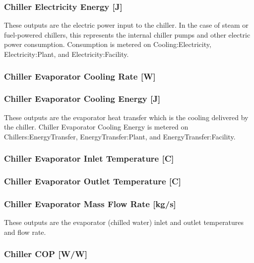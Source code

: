 \subsubsection{Chiller Electricity Energy {[}J{]}}\label{chiller-electric-energy-j}

These outputs are the electric power input to the chiller. In the case of steam or fuel-powered chillers, this represents the internal chiller pumps and other electric power consumption. Consumption is metered on Cooling:Electricity, Electricity:Plant, and Electricity:Facility.

\subsubsection{Chiller Evaporator Cooling Rate {[}W{]}}\label{chiller-evaporator-cooling-rate-w}

\subsubsection{Chiller Evaporator Cooling Energy {[}J{]}}\label{chiller-evaporator-cooling-energy-j}

These outputs are the evaporator heat transfer which is the cooling delivered by the chiller. Chiller Evaporator Cooling Energy is metered on Chillers:EnergyTransfer, EnergyTransfer:Plant, and EnergyTransfer:Facility.

\subsubsection{Chiller Evaporator Inlet Temperature {[}C{]}}\label{chiller-evaporator-inlet-temperature-c}

\subsubsection{Chiller Evaporator Outlet Temperature {[}C{]}}\label{chiller-evaporator-outlet-temperature-c}

\subsubsection{Chiller Evaporator Mass Flow Rate {[}kg/s{]}}\label{chiller-evaporator-mass-flow-rate-kgs}

These outputs are the evaporator (chilled water) inlet and outlet temperatures and flow rate.

\subsubsection{Chiller COP {[}W/W{]}}\label{chiller-cop-ww}

